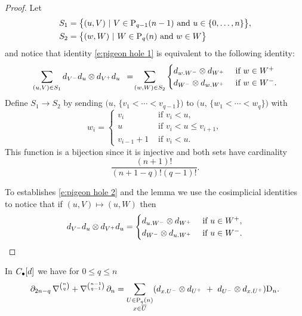 \begin{proof}
	Let
	\begin{align*}
	& S_1 = \big\{ (u, V)\ |\ V \in \P_{q-1}(n-1) \text{ and } u \in \{0,\dots,n\} \big\}, \\
	& S_2 = \big\{ (w, W)\ |\ W \in \P_{q}(n) \text{ and } w \in W \big\}
	\end{align*}
	and notice that identity \eqref{e:pigeon hole 1} is equivalent to the following identity:
	\begin{equation} \label{e:pigeon hole 2}
	\sum_{(u, V) \in S_1} d_{V^-}d_u \tensor d_{V^+}d_u \ \, = \!
	\sum_{(w, W) \in S_2} 
	\begin{cases}
	d_{w.W^-} \tensor d_{W^+} & \text{ if } w \in W^+ \\
	d_{W^-} \tensor d_{w.W^+} & \text{ if } w \in W^-.
	\end{cases}
	\end{equation}	
	Define $S_1 \to S_2$ by sending $\big(u,\, \{v_1 < \cdots < v_{q-1}\} \big)$ to $\big(u,\, \{w_1 < \cdots < w_{q}\} \big)$ with
	\begin{equation*}
	w_i = 
	\begin{cases}
	v_i & \text{ if } v_i < u, \\
	u & \text{ if } v_i < u \leq v_{i+1}, \\
	v_{i-1}+1 & \text{ if } v_i < u.
	\end{cases}
	\end{equation*} 
	This function is a bijection since it is injective and both sets have cardinality 
	\begin{equation*}
	\frac{(n+1)!}{(n+1-q)!(q-1)!}.
	\end{equation*}
	
	To establishes \eqref{e:pigeon hole 2} and the lemma we use the cosimplicial identities to notice that if $(u, V) \mapsto (u, W)$ then
	\begin{equation*}
	d_{V^-}d_u \tensor d_{V^+}d_u =
	\begin{cases}
	d_{u.W^-} \tensor d_{W^+} & \text{ if } u \in W^+, \\
	d_{W^-} \tensor d_{u.W^+} & \text{ if } u \in W^-.
	\end{cases}
	\end{equation*}
\end{proof}


\begin{lemma} \label{lemma3: existence}
	In $\chains[d]$ we have for $0 \leq q \leq n$
	\begin{equation} \label{lemma3: existence: eq1}
	\partial_{2n-q}\,\nabla^{n \choose q} + \nabla^{n-1 \choose q-1}\,\partial_n = 
	\sum_{\substack{U\in\P_{q}(n) \\ x\in\overline{U}}} (d_{x.U^-} \tensor d_{U^+}\ +\ d_{U^-} \tensor d_{x.U^+})\D_n.
	\end{equation}
\end{lemma}


